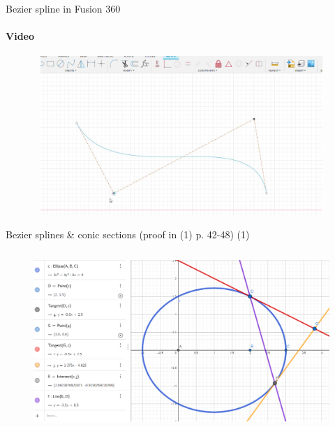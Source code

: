 \documentclass[aspectratio=169]{beamer}
\begin{document}
\begin{frame}[t]{Bezier spline in Fusion 360}
    \framesubtitle{Video}
    \vspace{-0.6cm}
    \begin{figure}[H]
        \href{run:./videos/bezier_spline_video.mp4}{
            \centering\includegraphics[height=6cm,width=1\textwidth,keepaspectratio]{bezier_spline_video_preview.jpg}}
    \end{figure}
\end{frame}

\begin{frame}[t]{Bezier splines \& conic sections (proof in (1) p. 42-48) (1)}
\framesubtitle{}
\vspace{-0.5cm}
            \begin{figure}[H]
                \centering\includegraphics[height=6.5cm,width=1\textwidth,keepaspectratio]{bezier_to_conic_intro.png}
                \label{fig:bezier_to_conic_intro.png}
            \end{figure}
\end{frame}
\end{document}
